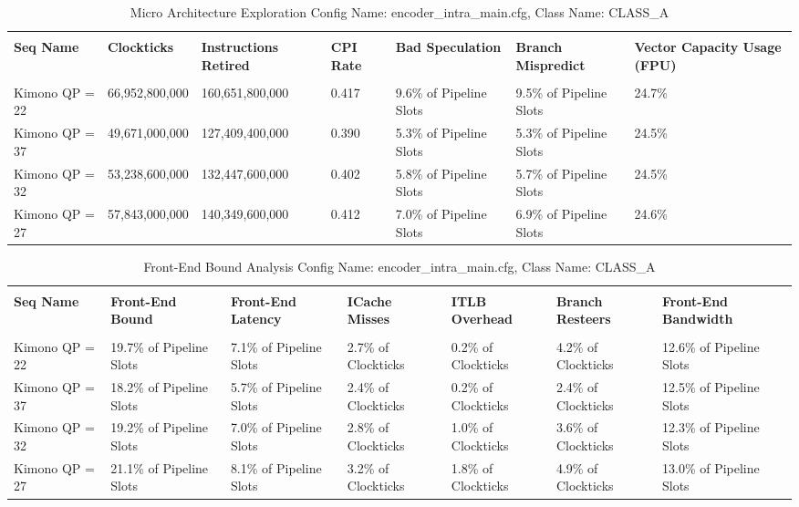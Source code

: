 \documentclass{article}%
\begin{document}
\newpage%
\begin{longtabu}{| X[l] | X[l] | X[l] | X[l] | X[l] | X[l] | X[l] |}%
\caption{%
Micro Architecture Exploration\newline%
 Config Name: encoder\_intra\_main.cfg,\newline%
 Class Name: CLASS\_A\newline%
%
}%
\hline%
&&&&&&\\%
\textbf{Seq Name}&\textbf{Clockticks}&\textbf{Instructions Retired}&\textbf{CPI Rate}&\textbf{Bad Speculation}&\textbf{Branch Mispredict}&\textbf{Vector Capacity Usage (FPU)}\\%
&&&&&&\\%
\hline%
\endhead%
Kimono\newline%
 QP = 22&66,952,800,000&160,651,800,000&0.417&9.6\% of Pipeline Slots&9.5\% of Pipeline Slots&24.7\%\\%
\hline%
Kimono\newline%
 QP = 37&49,671,000,000&127,409,400,000&0.390&5.3\% of Pipeline Slots&5.3\% of Pipeline Slots&24.5\%\\%
\hline%
Kimono\newline%
 QP = 32&53,238,600,000&132,447,600,000&0.402&5.8\% of Pipeline Slots&5.7\% of Pipeline Slots&24.5\%\\%
\hline%
Kimono\newline%
 QP = 27&57,843,000,000&140,349,600,000&0.412&7.0\% of Pipeline Slots&6.9\% of Pipeline Slots&24.6\%\\%
\hline%
\end{longtabu}%
\begin{longtabu}{| X[l] | X[l] | X[l] | X[l] | X[l] | X[l] | X[l] |}%
\caption{%
Front{-}End Bound Analysis\newline%
 Config Name: encoder\_intra\_main.cfg,\newline%
 Class Name: CLASS\_A\newline%
%
}%
\hline%
&&&&&&\\%
\textbf{Seq Name}&\textbf{Front{-}End Bound}&\textbf{Front{-}End Latency}&\textbf{ICache Misses}&\textbf{ITLB Overhead}&\textbf{Branch Resteers}&\textbf{Front{-}End Bandwidth}\\%
&&&&&&\\%
\hline%
\endhead%
Kimono\newline%
 QP = 22&19.7\% of Pipeline Slots&7.1\% of Pipeline Slots&2.7\% of Clockticks&0.2\% of Clockticks&4.2\% of Clockticks&12.6\% of Pipeline Slots\\%
\hline%
Kimono\newline%
 QP = 37&18.2\% of Pipeline Slots&5.7\% of Pipeline Slots&2.4\% of Clockticks&0.2\% of Clockticks&2.4\% of Clockticks&12.5\% of Pipeline Slots\\%
\hline%
Kimono\newline%
 QP = 32&19.2\% of Pipeline Slots&7.0\% of Pipeline Slots&2.8\% of Clockticks&1.0\% of Clockticks&3.6\% of Clockticks&12.3\% of Pipeline Slots\\%
\hline%
Kimono\newline%
 QP = 27&21.1\% of Pipeline Slots&8.1\% of Pipeline Slots&3.2\% of Clockticks&1.8\% of Clockticks&4.9\% of Clockticks&13.0\% of Pipeline Slots\\%
\hline%
\end{longtabu}%
\end{document}
